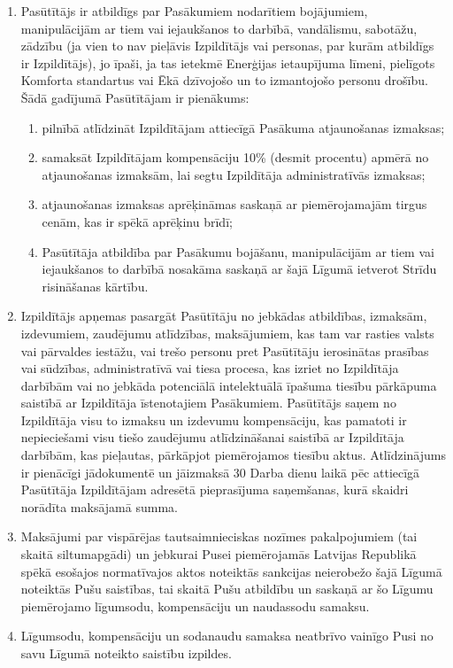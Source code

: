 \begin{multicols}{2}
\begin{enumerate}
\begin{enumerate}
	\end{enumerate}
	\item Pasūtītājs ir atbildīgs par Pasākumiem nodarītiem bojājumiem, manipulācijām ar tiem vai iejaukšanos to darbībā, vandālismu, sabotāžu, zādzību (ja vien to nav pieļāvis Izpildītājs vai personas, par kurām atbildīgs ir Izpildītājs), jo īpaši, ja tas ietekmē Enerģijas ietaupījuma līmeni, pielīgots Komforta standartus vai Ēkā dzīvojošo un to izmantojošo personu drošību. Šādā gadījumā Pasūtītājam ir pienākums:
	\begin{enumerate}
	\item pilnībā atlīdzināt Izpildītājam attiecīgā Pasākuma atjaunošanas izmaksas;
	\item samaksāt Izpildītājam kompensāciju 10\% (desmit procentu) apmērā no atjaunošanas izmaksām, lai segtu Izpildītāja administratīvās izmaksas;
	\item atjaunošanas izmaksas aprēķināmas saskaņā ar piemērojamajām tirgus cenām, kas ir spēkā aprēķinu brīdī;
	\item Pasūtītāja atbildība par Pasākumu bojāšanu, manipulācijām ar tiem vai iejaukšanos to darbībā nosakāma saskaņā ar šajā Līgumā ietverot Strīdu risināšanas kārtību.
	\end{enumerate}
	\item Izpildītājs apņemas pasargāt Pasūtītāju no jebkādas atbildības, izmaksām, izdevumiem, zaudējumu atlīdzības, maksājumiem, kas tam var rasties valsts vai pārvaldes iestāžu, vai trešo personu pret Pasūtītāju ierosinātas prasības vai sūdzības, administratīvā vai tiesa procesa, kas izriet no Izpildītāja darbībām vai no jebkāda potenciālā intelektuālā īpašuma tiesību pārkāpuma saistībā ar Izpildītāja īstenotajiem Pasākumiem. Pasūtītājs saņem no Izpildītāja  visu to izmaksu un izdevumu kompensāciju, kas pamatoti ir nepieciešami visu tiešo zaudējumu atlīdzināšanai saistībā ar Izpildītāja darbībām, kas pieļautas, pārkāpjot piemērojamos tiesību aktus. Atlīdzinājums ir pienācīgi jādokumentē un jāizmaksā 30 Darba dienu laikā pēc attiecīgā Pasūtītāja Izpildītājam adresētā pieprasījuma saņemšanas, kurā skaidri norādīta maksājamā summa.
	\item Maksājumi par vispārējas tautsaimnieciskas nozīmes pakalpojumiem (tai skaitā siltumapgādi) un jebkurai Pusei piemērojamās Latvijas Republikā spēkā esošajos normatīvajos aktos noteiktās sankcijas neierobežo šajā Līgumā noteiktās Pušu saistības, tai skaitā Pušu atbildību un saskaņā ar šo Līgumu piemērojamo līgumsodu, kompensāciju un naudassodu samaksu.
	\item Līgumsodu, kompensāciju un sodanaudu samaksa neatbrīvo vainīgo Pusi no savu Līgumā noteikto saistību izpildes.
\end{enumerate}


\end{multicols}

